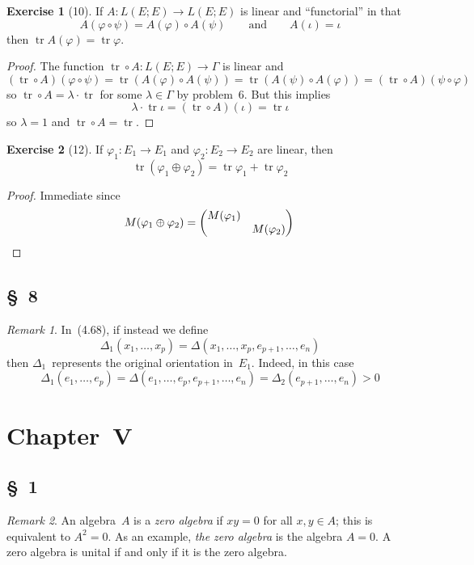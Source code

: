 \documentclass[letterpaper,12pt]{article}
\DeclareMathOperator{\tr}{tr}
\newcommand{\after}{\circ}
\newcommand{\dsum}{\oplus}
\newcommand{\mult}{\cdot}
\theoremstyle{definition}
\newtheorem*{exer}{Exercise}
\theoremstyle{remark}
\newtheorem*{rmk}{Remark}
\begin{document}
\begin{exer}[10]
If \(A:L(E;E)\to L(E;E)\) is linear and ``functorial'' in that
\[A(\varphi\after\psi)=A(\varphi)\after A(\psi)\qquad\text{and}\qquad A(\iota)=\iota\]
then \(\tr A(\varphi)=\tr\varphi\).
\end{exer}
\begin{proof}
The function \(\tr\after A:L(E;E)\to\Gamma\) is linear and
\[(\tr\after A)(\varphi\after\psi)=\tr(A(\varphi)\after A(\psi))=\tr(A(\psi)\after A(\varphi))=(\tr\after A)(\psi\after\varphi)\]
so \(\tr\after A=\lambda\mult\tr\) for some \(\lambda\in\Gamma\) by problem~6. But this implies
\[\lambda\mult\tr\iota=(\tr\after A)(\iota)=\tr\iota\]
so \(\lambda=1\) and \(\tr\after A=\tr\).
\end{proof}

\begin{exer}[12]
If \(\varphi_1:E_1\to E_1\) and \(\varphi_2:E_2\to E_2\) are linear, then
\[\tr(\varphi_1\dsum\varphi_2)=\tr\varphi_1+\tr\varphi_2\]
\end{exer}
\begin{proof}
Immediate since
\[M(\varphi_1\dsum\varphi_2)=\begin{pmatrix}
M(\varphi_1)&\\
&M(\varphi_2)
\end{pmatrix}\qedhere\]
\end{proof}

\subsection*{\S~8}
\begin{rmk}
In~(4.68), if instead we define
\[\Delta_1(x_1,\ldots,x_p)=\Delta(x_1,\ldots,x_p,e_{p+1},\ldots,e_n)\]
then \(\Delta_1\)~represents the original orientation in~\(E_1\). Indeed, in this case
\[\Delta_1(e_1,\ldots,e_p)=\Delta(e_1,\ldots,e_p,e_{p+1},\ldots,e_n)=\Delta_2(e_{p+1},\ldots,e_n)>0\]
\end{rmk}

\section*{Chapter~V}
\subsection*{\S~1}
\begin{rmk}
An algebra~\(A\) is a \emph{zero algebra} if \(xy=0\) for all \(x,y\in A\); this is equivalent to \(A^2=0\). As an example, \emph{the zero algebra} is the algebra \(A=0\). A zero algebra is unital if and only if it is the zero algebra.
\end{rmk}
\end{document}
